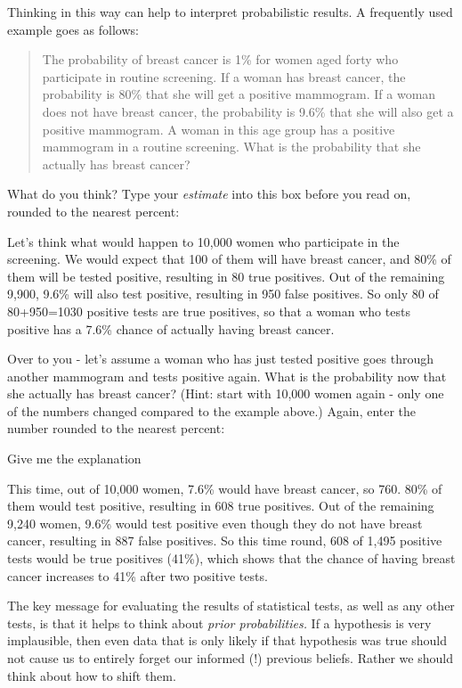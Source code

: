 \documentclass[
]{book}
\begin{document}
Thinking in this way can help to interpret probabilistic results. A frequently used example \citep{gigerenzer1995improve} goes as follows:

\begin{quote}
The probability of breast cancer is 1\% for women aged forty who participate in routine screening. If a woman has breast cancer, the probability is 80\% that she will get a positive mammogram. If a woman does not have breast cancer, the probability is 9.6\% that she will also get a positive mammogram. A woman in this age group has a positive mammogram in a routine screening. What is the probability that she actually has breast cancer?
\end{quote}

What do you think? Type your \emph{estimate} into this box before you read on, rounded to the nearest percent:

Let's think what would happen to 10,000 women who participate in the screening. We would expect that 100 of them will have breast cancer, and 80\% of them will be tested positive, resulting in 80 true positives. Out of the remaining 9,900, 9.6\% will also test positive, resulting in 950 false positives. So only 80 of 80+950=1030 positive tests are true positives, so that a woman who tests positive has a 7.6\% chance of actually having breast cancer.

Over to you - let's assume a woman who has just tested positive goes through another mammogram and tests positive again. What is the probability now that she actually has breast cancer? (Hint: start with 10,000 women again - only one of the numbers changed compared to the example above.) Again, enter the number rounded to the nearest percent:

Give me the explanation

This time, out of 10,000 women, 7.6\% would have breast cancer, so 760. 80\% of them would test positive, resulting in 608 true positives. Out of the remaining 9,240 women, 9.6\% would test positive even though they do not have breast cancer, resulting in 887 false positives. So this time round, 608 of 1,495 positive tests would be true positives (41\%), which shows that the chance of having breast cancer increases to 41\% after two positive tests.

The key message for evaluating the results of statistical tests, as well as any other tests, is that it helps to think about \emph{prior probabilities.} If a hypothesis is very implausible, then even data that is only likely if that hypothesis was true should not cause us to entirely forget our informed (!) previous beliefs. Rather we should think about how to shift them.
\end{document}
